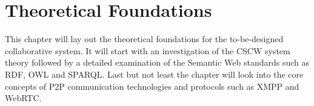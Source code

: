 
\chapter{Theoretical Foundations} %
\label{cha:theoretical_foundations}

This chapter will lay out the theoretical foundations for the to-be-designed collaborative system. It will start with an investigation of the \gls{CSCW} system theory followed by a detailed examination of the Semantic Web standards such as \gls{RDF}, \gls{OWL} and \gls{SPARQL}. Last but not least the chapter will look into the core concepts of \gls{P2P} communication technologies and protocols such as \gls{XMPP} and \gls{WebRTC}.







